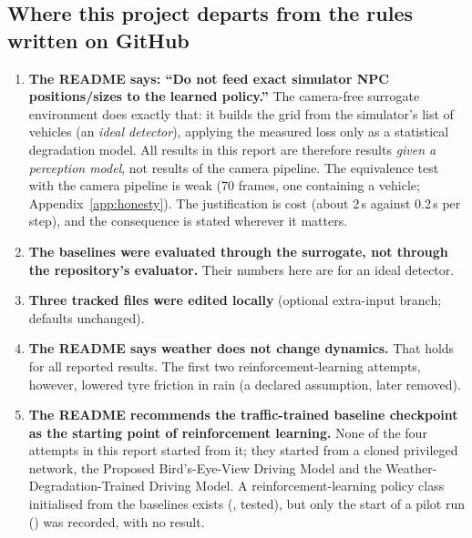 \subsection{Where this project departs from the rules written on GitHub}
\begin{cautionbox}
\begin{enumerate}
\item \textbf{The README says: ``Do not feed exact simulator NPC positions/sizes to the learned policy.''} The camera-free surrogate environment does exactly that: it builds the grid from the simulator's list of vehicles (an \emph{ideal detector}), applying the measured loss only as a statistical degradation model. All results in this report are therefore results \emph{given a perception model}, not results of the camera pipeline. The equivalence test with the camera pipeline is weak (70 frames, one containing a vehicle; Appendix~\ref{app:honesty}). The justification is cost (about 2\,s against 0.2\,s per step), and the consequence is stated wherever it matters.
\item \textbf{The baselines were evaluated through the surrogate, not through the repository's evaluator.} Their numbers here are for an ideal detector.
\item \textbf{Three tracked files were edited locally} (optional extra-input branch; defaults unchanged).
\item \textbf{The README says weather does not change dynamics.} That holds for all reported results. The first two reinforcement-learning attempts, however, lowered tyre friction in rain (a declared assumption, later removed).
\item \textbf{The README recommends the traffic-trained baseline checkpoint as the starting point of reinforcement learning.} None of the four attempts in this report started from it; they started from a cloned privileged network, the Proposed Bird's-Eye-View Driving Model and the Weather-Degradation-Trained Driving Model. A reinforcement-learning policy class initialised from the baselines exists (, tested), but only the start of a pilot run () was recorded, with no result.
\end{enumerate}
\end{cautionbox}

